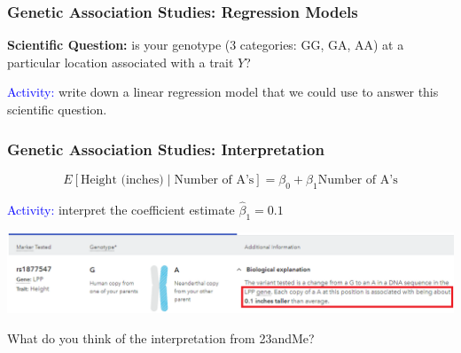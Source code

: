 \documentclass[12pt, 
hyperref={colorlinks=true, linkcolor=blue, urlcolor=cyan},dvipsnames]{beamer}
\begin{document}
\begin{frame}
\frametitle{Genetic Association Studies: Regression Models}

\textbf{Scientific Question:} is your genotype (3 categories: GG, GA, AA) at a particular location associated with a trait $Y$? \pause

\textcolor{blue}{Activity:} write down a linear regression model that we could use to answer this scientific question.

\end{frame}

\begin{frame}
\frametitle{Genetic Association Studies: Interpretation}

$$E[\text{Height (inches)} \mid \text{Number of A's}] = \beta_0 + \beta_1 \text{Number of A's}$$

\textcolor{blue}{Activity:} interpret the coefficient estimate $\hat\beta_1 = 0.1$ \pause

\hspace*{-1cm}
\includegraphics[width=1.17\textwidth]{figs/23andMe_interp}

What do you think of the interpretation from 23andMe?

\end{frame}
\end{document}
